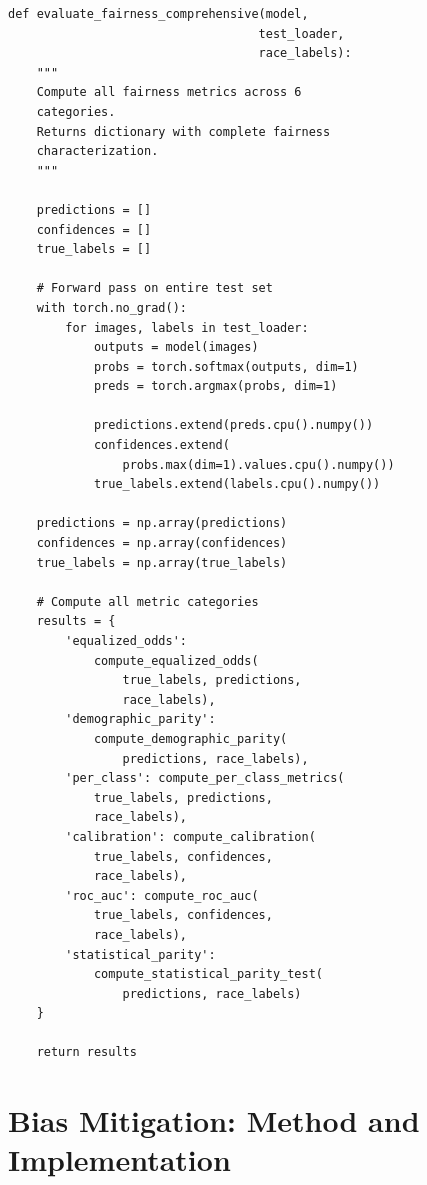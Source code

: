 \documentclass[11pt,a4paper,oneside]{report}
\begin{document}
\begin{lstlisting}[caption=Fairness Evaluation Framework]
def evaluate_fairness_comprehensive(model, 
                                   test_loader, 
                                   race_labels):
    """
    Compute all fairness metrics across 6 
    categories.
    Returns dictionary with complete fairness 
    characterization.
    """
    
    predictions = []
    confidences = []
    true_labels = []
    
    # Forward pass on entire test set
    with torch.no_grad():
        for images, labels in test_loader:
            outputs = model(images)
            probs = torch.softmax(outputs, dim=1)
            preds = torch.argmax(probs, dim=1)
            
            predictions.extend(preds.cpu().numpy())
            confidences.extend(
                probs.max(dim=1).values.cpu().numpy())
            true_labels.extend(labels.cpu().numpy())
    
    predictions = np.array(predictions)
    confidences = np.array(confidences)
    true_labels = np.array(true_labels)
    
    # Compute all metric categories
    results = {
        'equalized_odds': 
            compute_equalized_odds(
                true_labels, predictions, 
                race_labels),
        'demographic_parity': 
            compute_demographic_parity(
                predictions, race_labels),
        'per_class': compute_per_class_metrics(
            true_labels, predictions, 
            race_labels),
        'calibration': compute_calibration(
            true_labels, confidences, 
            race_labels),
        'roc_auc': compute_roc_auc(
            true_labels, confidences, 
            race_labels),
        'statistical_parity': 
            compute_statistical_parity_test(
                predictions, race_labels)
    }
    
    return results
\end{lstlisting}


\chapter{Bias Mitigation: Method and Implementation}
\end{document}
